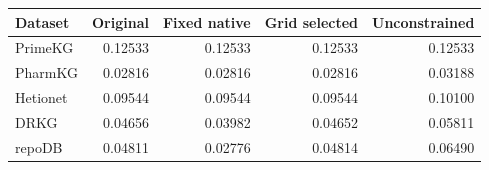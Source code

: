 \begin{tabular}{lrrrr}
\toprule
Dataset & Original & Fixed native & Grid selected & Unconstrained \\
\midrule
PrimeKG & 0.12533 & 0.12533 & 0.12533 & 0.12533 \\
PharmKG & 0.02816 & 0.02816 & 0.02816 & 0.03188 \\
Hetionet & 0.09544 & 0.09544 & 0.09544 & 0.10100 \\
DRKG & 0.04656 & 0.03982 & 0.04652 & 0.05811 \\
repoDB & 0.04811 & 0.02776 & 0.04814 & 0.06490 \\
\bottomrule
\end{tabular}

